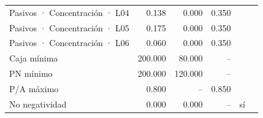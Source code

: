 \begin{table}[htbp]
{\begin{tabular}{lrrrll}
Pasivos · Concentración · L04 & 0.138 & 0.000 & 0.350 &  &  \\
Pasivos · Concentración · L05 & 0.175 & 0.000 & 0.350 &  &  \\
Pasivos · Concentración · L06 & 0.060 & 0.000 & 0.350 &  &  \\
Caja mínima & 200.000 & 80.000 & -- &  &  \\
PN mínimo & 200.000 & 120.000 & -- &  &  \\
P/A máximo & 0.800 & -- & 0.850 &  &  \\
No negatividad & 0.000 & 0.000 & -- & sí &  \\
\bottomrule
\end{tabular}}
\end{table}
